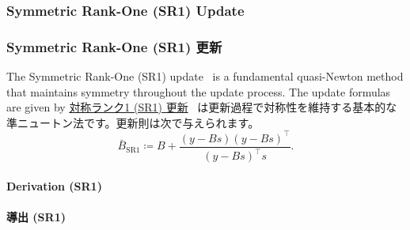 \documentclass[0_main]{subfiles}
\begin{document}
\ifEn
    \subsubsection{Symmetric Rank-One (SR1) Update}
\else
    \subsubsection{Symmetric Rank-One (SR1) 更新}
\fi

\ifEn
    The Symmetric Rank-One (SR1) update~\citep{nocedal1999numerical} is a fundamental quasi-Newton method that maintains symmetry throughout the update process. The update formulas are given by
\else
    \href{https://en.wikipedia.org/wiki/Symmetric_rank-one}{対称ランク1 (SR1) 更新}~\citep{nocedal1999numerical} は更新過程で対称性を維持する基本的な準ニュートン法です。更新則は次で与えられます。
\fi
\begin{equation*}
    \bar{B}_{\mathrm{SR1}} \coloneqq B + \frac{(y - B s)(y - B s)^\top}{(y - B s)^\top s}.
\end{equation*}

\ifEn
    \paragraph{Derivation (SR1)}
\else
    \paragraph{導出 (SR1)}
\fi
\end{document}
